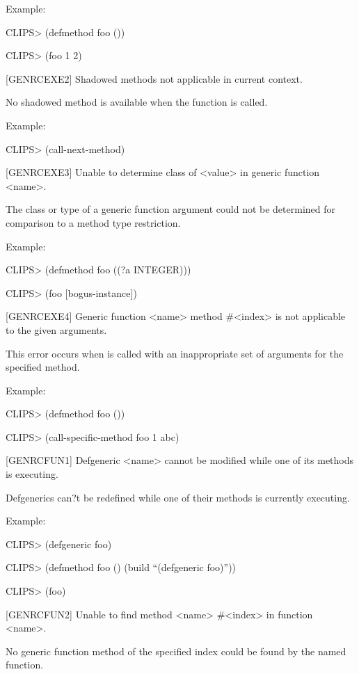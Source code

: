 \documentclass[letterpaper,10pt,english]{sphinxmanual}
\begin{document}
Example:

CLIPS\textgreater{} (defmethod foo ())

CLIPS\textgreater{} (foo 1 2)

{[}GENRCEXE2{]} Shadowed methods not applicable in current context.

No shadowed method is available when the function 
is called.

Example:

CLIPS\textgreater{} (call-next-method)

{[}GENRCEXE3{]} Unable to determine class of \textless{}value\textgreater{} in generic function
\textless{}name\textgreater{}.

The class or type of a generic function argument could not be determined
for comparison to a method type restriction.

Example:

CLIPS\textgreater{} (defmethod foo ((?a INTEGER)))

CLIPS\textgreater{} (foo {[}bogus-instance{]})

{[}GENRCEXE4{]} Generic function \textless{}name\textgreater{} method \#\textless{}index\textgreater{} is not applicable to
the given arguments.

This error occurs when  is called with an
inappropriate set of arguments for the specified method.

Example:

CLIPS\textgreater{} (defmethod foo ())

CLIPS\textgreater{} (call-specific-method foo 1 abc)

{[}GENRCFUN1{]} Defgeneric \textless{}name\textgreater{} cannot be modified while one of its
methods is executing.

Defgenerics can?t be redefined while one of their methods is currently
executing.

Example:

CLIPS\textgreater{} (defgeneric foo)

CLIPS\textgreater{} (defmethod foo () (build “(defgeneric foo)”))

CLIPS\textgreater{} (foo)

{[}GENRCFUN2{]} Unable to find method \textless{}name\textgreater{} \#\textless{}index\textgreater{} in function \textless{}name\textgreater{}.

No generic function method of the specified index could be found by the
named function.
\end{document}
